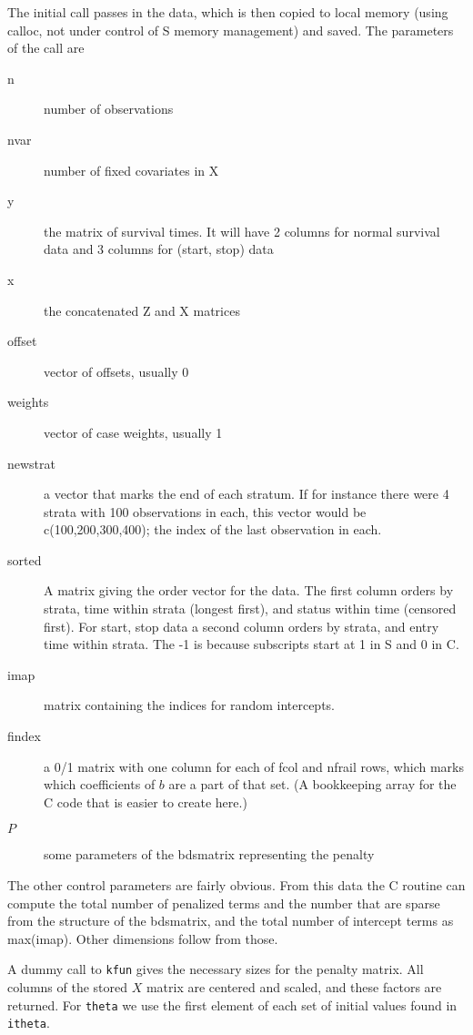 \documentclass{article}
\begin{document}
The initial call passes in the data, which is then copied to
local memory (using calloc, not under control of S memory
management) and saved.  The parameters of the call are
\begin{description}
  \item[n] number of observations
  \item[nvar] number of fixed covariates in X 
  \item[y] the matrix of survival times.  It will have 2 columns for normal
    survival data and 3 columns for (start, stop) data
  \item[x] the concatenated Z and X matrices
  \item[offset] vector of offsets, usually 0
  \item[weights] vector of case weights, usually 1
  \item[newstrat] a vector that marks the end of each stratum.  If for 
    instance there were 4 strata with 100 observations in each, this vector
    would be c(100,200,300,400); the index of the last observation in each.
  \item[sorted] A matrix giving the order vector for the data.  The first 
    column orders by strata, time within strata (longest first), and status
    within time (censored first).  For start, stop data a second column orders
    by strata, and entry time within strata. The -1 is because subscripts 
    start at 1 in S and 0 in C.
  \item[imap] matrix containing the indices for random intercepts.  
  \item[findex] a 0/1 matrix with one column for each of fcol and nfrail
    rows, which marks which coefficients of $b$ are a part of that set.
    (A bookkeeping array for the C code that is easier to create here.)
  \item[$P$] some parameters of the bdsmatrix representing the penalty  
\end{description}
The other control parameters are fairly obvious.  From this data the C
routine can compute the total number of penalized terms and the number that
are sparse from the structure of the bdsmatrix, and the total number of
intercept terms as max(imap).  Other dimensions follow from those.

A dummy call to {\tt{}kfun} gives the necessary sizes for the penalty matrix.
All columns of the stored $X$ matrix are centered and scaled, and these
factors are returned.  
For {\tt{}theta} we use the first element of each set of initial values found
in {\tt{}itheta}.
\end{document}
